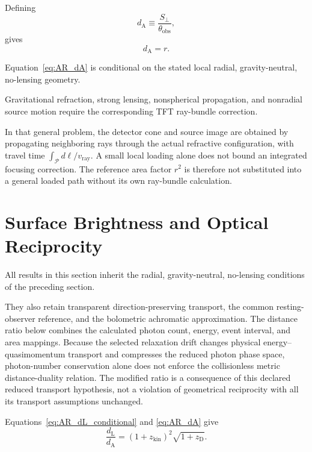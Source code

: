 Defining
\begin{equation}
    d_{\mathrm A}
    \equiv
    \frac{
        S_\perp
    }{
        \theta_{\mathrm{obs}}
    },
\end{equation}
gives
\begin{equation}
    \boxed{
    d_{\mathrm A}
    =
    r.
    }
    \label{eq:AR_dA}
\end{equation}

Equation~\eqref{eq:AR_dA} is conditional on the stated local radial,
gravity-neutral, no-lensing geometry.

Gravitational refraction, strong lensing, nonspherical propagation, and
nonradial source motion require the corresponding TFT ray-bundle correction.

In that general problem, the detector cone and source image are obtained by
propagating neighboring rays through the actual refractive configuration,
with travel time \(\int_{\mathcal P}d\ell/v_{\mathrm{ray}}\). A small local
loading alone does not bound an integrated focusing correction. The reference
area factor \(r^2\) is therefore not substituted into a general loaded path
without its own ray-bundle calculation.


\section{Surface Brightness and Optical Reciprocity}

All results in this section inherit the radial, gravity-neutral, no-lensing
conditions of the preceding section.

They also retain transparent direction-preserving transport, the common
resting-observer reference, and the bolometric achromatic approximation.
The distance ratio below combines the calculated photon count, energy, event
interval, and area mappings. Because the selected relaxation drift changes
physical energy--quasimomentum transport and compresses the reduced photon
phase space, photon-number conservation alone does not enforce the
collisionless metric distance-duality relation. The modified ratio is a
consequence of this declared reduced transport hypothesis, not a violation
of geometrical reciprocity with all its transport assumptions unchanged.

Equations~\eqref{eq:AR_dL_conditional} and
\eqref{eq:AR_dA} give
\begin{equation}
    \boxed{
    \frac{
        d_{\mathrm L}
    }{
        d_{\mathrm A}
    }
    =
    (1+z_{\mathrm{kin}})^2
    \sqrt{
        1+z_{\mathrm D}
    }.
    }
\end{equation}

